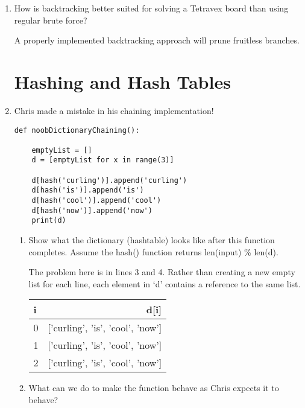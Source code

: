 \documentclass[11pt]{article}
\newenvironment{answer}{\large\lstset{basicstyle=\large}\color{white}}{}
\newenvironment{answer}{\large\lstset{basicstyle=\large}\color{red}}{}
\begin{document}
\begin{enumerate}
\item How is backtracking better suited for solving a Tetravex board than
      using regular brute force?

    \begin{answer}
    A properly implemented backtracking approach will prune fruitless branches. 
    \end{answer}

\pagebreak
\section*{Hashing and Hash Tables}

\item Chris made a mistake in his chaining implementation!

\begin{lstlisting}
def noobDictionaryChaining():

    emptyList = []
    d = [emptyList for x in range(3)]

    d[hash('curling')].append('curling')
    d[hash('is')].append('is')
    d[hash('cool')].append('cool')
    d[hash('now')].append('now')
    print(d)
\end{lstlisting}

    \begin{enumerate}
    \item Show what the dictionary (hashtable) looks like after this function
          completes. Assume the hash() function returns len(input) \% len(d).

        \begin{answer}
            The problem here is in lines 3 and 4. Rather than creating a new
            empty list for each line, each element in `d' contains a reference
            to the same list.

            \begin{tabular}{l | r}
    
        	i & d[i] \\ \hline
    		0 & ['curling', 'is', 'cool', 'now'] \\ 
    		1 & ['curling', 'is', 'cool', 'now'] \\
    		2 & ['curling', 'is', 'cool', 'now'] \\
    
    	    \end{tabular}
        \end{answer}

    \item What can we do to make the function behave as Chris expects it to
          behave?


\end{enumerate}
\end{enumerate}
\end{document}
